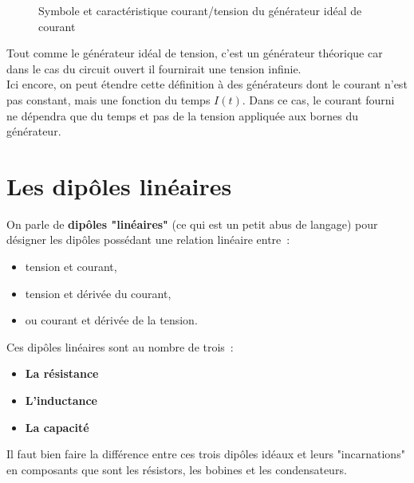 \begin{figure}[!h]
\begin{center}

\hspace{1cm}

\end{center}
\caption{ Symbole et caractéristique courant/tension du générateur idéal de courant}
\end{figure}

Tout comme le générateur idéal de tension, c'est un générateur théorique car dans le cas du circuit ouvert il fournirait une tension infinie.\\

Ici encore, on peut étendre cette définition à des générateurs dont le courant n'est pas constant, mais une fonction du temps $I(t)$. Dans ce cas, le courant fourni ne dépendra que du temps et pas de la tension appliquée aux bornes du générateur.


\section{ Les dipôles linéaires }

On parle de \textbf{dipôles "linéaires"} (ce qui est un petit abus de langage) pour désigner les dipôles possédant une relation linéaire entre~:\\
\begin{itemize}
\item tension et courant, 
\item tension et dérivée du courant,
\item ou courant et dérivée de la tension.\\
\end{itemize}

Ces dipôles linéaires sont au nombre de trois~: \\

\begin{itemize}
\item \textbf{La résistance}
\item \textbf{L'inductance}
\item \textbf{La capacité} \\
\end{itemize}

Il faut bien faire la différence entre ces trois dipôles idéaux et leurs "incarnations" en composants que sont les résistors, les bobines et les condensateurs. \\

